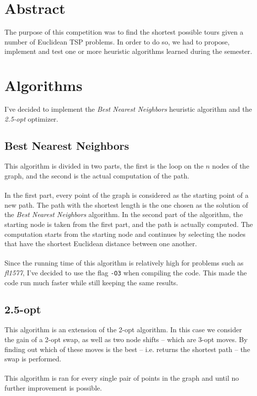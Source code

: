 \documentclass[unicode,11pt,a4paper,oneside,numbers=endperiod,openany]{scrartcl}
\begin{document}
\graphicspath{ {./assets/} }

\setassignment
{}

\newline

\tableofcontents

\newpage

\section{Abstract}
The purpose of this competition was to find the shortest possible tours given a number of Euclidean TSP problems. In order to do so, we had to propose, implement and test one or more heuristic algorithms learned during the semester.

\section{Algorithms}
I've decided to implement the \textit{Best Nearest Neighbors} heuristic algorithm and the \textit{2.5-opt} optimizer.

\subsection{Best Nearest Neighbors}
This algorithm is divided in two parts, the first is the loop on the $n$ nodes of the graph, and the second is the actual computation of the path. \\ \\
In the first part, every point of the graph is considered as the starting point of a new path. The path with the shortest length is the one chosen as the solution of the \textit{Best Nearest Neighbors} algorithm. In the second part of the algorithm, the starting node is taken from the first part, and the path is actually computed. The computation starts from the starting node and continues by selecting the nodes that have the shortest Euclidean distance between one another. \\ \\
Since the running time of this algorithm is relatively high for problems such as \textit{fl1577}, I've decided to use the flag \verb|-O3| when compiling the code. This made the code run much faster while still keeping the same results.

\subsection{2.5-opt}
This algorithm is an extension of the 2-opt algorithm. In this case we consider the gain of a 2-opt swap, as well as two node shifts -- which are 3-opt moves. By finding out which of these moves is the best -- i.e. returns the shortest path -- the swap is performed. \\ \\
This algorithm is ran for every single pair of points in the graph and until no further improvement is possible.
\end{document}
